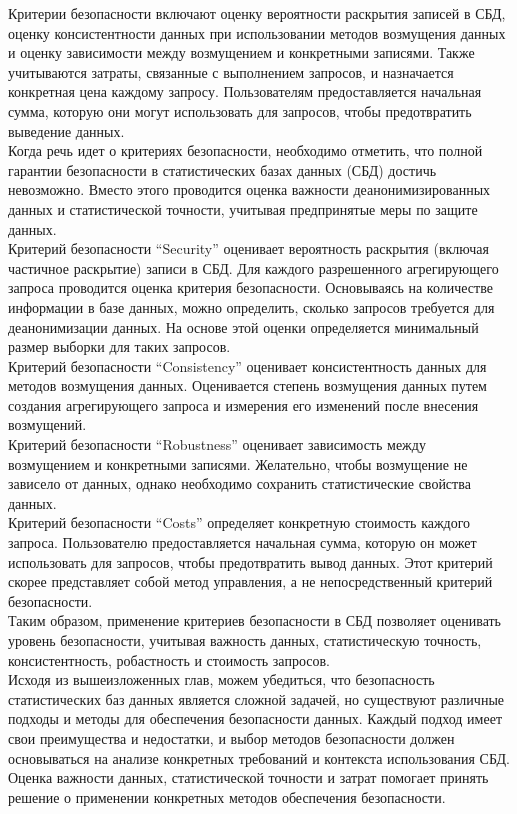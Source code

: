 Критерии безопасности включают оценку вероятности раскрытия записей в СБД, оценку консистентности данных при использовании методов возмущения данных и оценку зависимости между возмущением и конкретными записями. Также учитываются затраты, связанные с выполнением запросов, и назначается конкретная цена каждому запросу. Пользователям предоставляется начальная сумма, которую они могут использовать для запросов, чтобы предотвратить выведение данных.
\\

Когда речь идет о критериях безопасности, необходимо отметить, что полной гарантии безопасности в статистических базах данных (СБД) достичь невозможно. Вместо этого проводится оценка важности деанонимизированных данных и статистической точности, учитывая предпринятые меры по защите данных.
\\

Критерий безопасности \enquote{Security} оценивает вероятность раскрытия (включая частичное раскрытие) записи в СБД. Для каждого разрешенного агрегирующего запроса проводится оценка критерия безопасности. Основываясь на количестве информации в базе данных, можно определить, сколько запросов требуется для деанонимизации данных. На основе этой оценки определяется минимальный размер выборки для таких запросов.
\\

Критерий безопасности \enquote{Consistency} оценивает консистентность данных для методов возмущения данных. Оценивается степень возмущения данных путем создания агрегирующего запроса и измерения его изменений после внесения возмущений. 
\\

Критерий безопасности \enquote{Robustness} оценивает зависимость между возмущением и конкретными записями. Желательно, чтобы возмущение не зависело от данных, однако необходимо сохранить статистические свойства данных.
\\

Критерий безопасности \enquote{Costs} определяет конкретную стоимость каждого запроса. Пользователю предоставляется начальная сумма, которую он может использовать для запросов, чтобы предотвратить вывод данных. Этот критерий скорее представляет собой метод управления, а не непосредственный критерий безопасности.
\\

Таким образом, применение критериев безопасности в СБД позволяет оценивать уровень безопасности, учитывая важность данных, статистическую точность, консистентность, робастность и стоимость запросов.
\\

Исходя из вышеизложенных глав, можем убедиться, что безопасность статистических баз данных является сложной задачей, но существуют различные подходы и методы для обеспечения безопасности данных. Каждый подход имеет свои преимущества и недостатки, и выбор методов безопасности должен основываться на анализе конкретных требований и контекста использования СБД. Оценка важности данных, статистической точности и затрат помогает принять решение о применении конкретных методов обеспечения безопасности.
